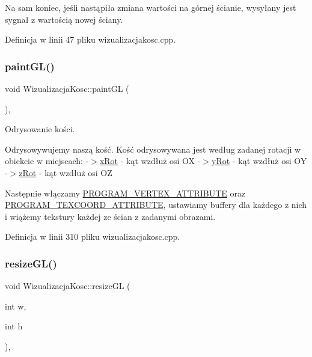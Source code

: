 Na sam koniec, jeśli nastąpiła zmiana wartości na górnej ścianie, wysyłany jest sygnał z wartością nowej ściany. 

Definicja w linii 47 pliku wizualizacjakosc.\+cpp.

\mbox{\label{class_wizualizacja_kosc_a2b5ddee0e92d08a200b1749c4629d71d}} 
\subsubsection{\texorpdfstring{paint\+G\+L()}{paintGL()}}
{\footnotesize\ttfamily void Wizualizacja\+Kosc\+::paint\+GL (\begin{DoxyParamCaption}{ }\end{DoxyParamCaption})\hspace{0.3cm}{\ttfamily [override]}, {\ttfamily [protected]}}



Odrysowanie kości. 

Odrysowywujemy naszą kość. Kość odrysowywana jest według zadanej rotacji w obiekcie w miejscach\+: -\/$>$\hyperlink{}{x\+Rot} -\/ kąt wzdłuż osi OX -\/$>$\hyperlink{}{y\+Rot} -\/ kąt wzdłuż osi OY -\/$>$\hyperlink{}{z\+Rot} -\/ kąt wzdłuż osi OZ

Następnie włączamy \hyperlink{wizualizacjakosc_8h_af540f470cb187c812771007568bc5138}{P\+R\+O\+G\+R\+A\+M\+\_\+\+V\+E\+R\+T\+E\+X\+\_\+\+A\+T\+T\+R\+I\+B\+U\+TE} oraz \hyperlink{wizualizacjakosc_8h_a7dce2afc0460b03f7535ad2d93c458e2}{P\+R\+O\+G\+R\+A\+M\+\_\+\+T\+E\+X\+C\+O\+O\+R\+D\+\_\+\+A\+T\+T\+R\+I\+B\+U\+TE}, ustawiamy buffery dla każdego z nich i wiążemy tekstury każdej ze ścian z zadanymi obrazami. 

Definicja w linii 310 pliku wizualizacjakosc.\+cpp.

\mbox{\label{class_wizualizacja_kosc_ad754ad7e1003c4ec6f4f29f126424701}} 
\subsubsection{\texorpdfstring{resize\+G\+L()}{resizeGL()}}
{\footnotesize\ttfamily void Wizualizacja\+Kosc\+::resize\+GL (\begin{DoxyParamCaption}\item[{int}]{w,  }\item[{int}]{h }\end{DoxyParamCaption})\hspace{0.3cm}{\ttfamily [override]}, {\ttfamily [protected]}}



